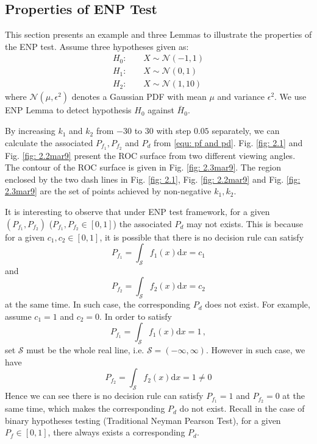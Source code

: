 
\subsection{Properties of ENP Test}
This section presents an example and three Lemmas to illustrate the properties of the ENP test. 
Assume three hypotheses given as:
\begin{equation}
  \label{2015jan29a2}
\begin{split}
H_0:\;\;\;\;&X \sim \mathcal{N}(-1, 1)\\
H_1:\;\;\;\;&X \sim \mathcal{N}(0, 1)\\
H_2:\;\;\;\;&X \sim \mathcal{N}(1, 10)
\end{split}
\end{equation}
where $\mathcal{N}(\mu, \epsilon^2)$ denotes a Gaussian PDF with mean $\mu$ and variance $\epsilon^2$. 
We use ENP Lemma to detect hypothesis $H_0$ against $\bar{H}_0$. 

By increasing $k_1$ and $k_2$ from $-30$ to $30$ with step $0.05$ separately, we can calculate the associated $P_{f_1}, P_{f_2}$ and $P_d$ from \eqref{equ: pf and pd}. 
Fig. \ref{fig: 2.1} and Fig. \ref{fig: 2.2mar9} present the ROC surface from two different viewing angles. The contour of the ROC surface is given in Fig. \ref{fig: 2.3mar9}. The region enclosed by the two dash lines in Fig. \ref{fig: 2.1}, Fig. \ref{fig: 2.2mar9} and Fig. \ref{fig: 2.3mar9} are the set of points achieved by non-negative $k_1, k_2$.  

It is interesting to observe that under ENP test framework, for a given $(P_{f_1}, P_{f_2})$  ($P_{f_1}, P_{f_2}\in [0, 1]$) the associated $P_d$ may not exists. This is because for a given $c_1, c_2 \in [0, 1]$, it is possible that there is no decision rule can satisfy
\[
  P_{f_1} = \int_{\mathcal{S}}f_1(x)\mathrm{d}x =  c_1
\]
and
\[
  P_{f_2} = \int_{\mathcal{S}}f_2(x)\mathrm{d}x = c_2
\]
at the same time. In such case, the corresponding $P_d$ does not exist. 
For example, assume $c_1 = 1$ and $c_2 = 0$. In order to satisfy 
\[
  P_{f_1} = \int_{\mathcal{S}}f_1(x)\mathrm{d}x = 1\,,
\]
set $\mathcal{S}$  must  be the whole real line, i.e. $\mathcal{S} = (-\infty, \infty)$. However in such case, we have
\[
  P_{f_2} = \int_{\mathcal{S}}f_2(x)\mathrm{d}x = 1 \neq 0
\]
Hence we can see there is no decision rule can satisfy $P_{f_1} = 1$ and $P_{f_2} = 0$ at the same time, which makes the corresponding $P_d$ do not exist.
Recall in the case of binary hypotheses testing (Traditional Neyman Pearson Test), for a given $P_f \in [0, 1]$, there always exists a corresponding $P_d$. 

